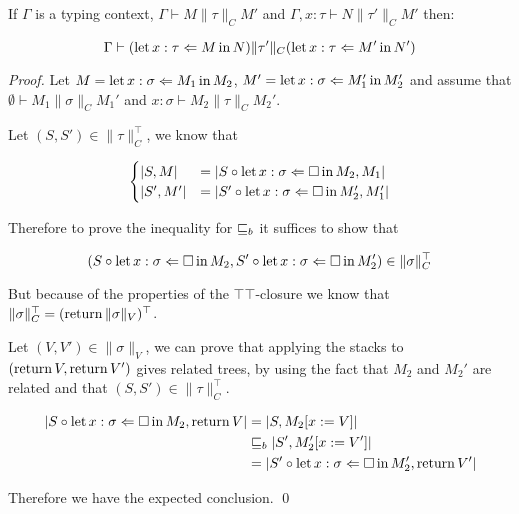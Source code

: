 \begin{lemma}
    If $\Gamma$ is a typing context,
    $\Gamma \vdash M \| \tau \|_C M'$ and 
    $\Gamma, x : \tau \vdash N \| \tau' \|_C M'$
    then:

    \begin{equation*}
        \Gamma \vdash (\Bind{M}{x:\tau}{N}) \| \tau' \|_C 
        (\Bind{M'}{x:\tau}{N'})
    \end{equation*}
\end{lemma}
\begin{proof}
Let $M = \Bind{M_1}{x:\sigma}{M_2}$,
$M' = \Bind{M_1'}{x:\sigma}{M_2'}$ and assume 
that $\emptyset \vdash M_1 \| \sigma \|_C M_1'$
and $x : \sigma \vdash M_2 \| \tau \|_C M_2'$.

Let $(S,S') \in \| \tau \|_C^\top$, we know that

\begin{equation*}
    \begin{cases}
        | S, M | &=
        | S \circ \Bind{\square}{x : \sigma}{M_2}, M_1| \\
        | S', M' | &=
        | S' \circ \Bind{\square}{x : \sigma}{M_2'}, M_1'| \\
    \end{cases}
\end{equation*}

Therefore to prove the inequality for $\sqeq_b$ it suffices 
to show that

\begin{equation*}
    (S \circ \Bind{\square}{x : \sigma}{M_2},
     S' \circ \Bind{\square}{x : \sigma}{M_2'})
     \in \| \sigma \|_C^\top
\end{equation*}

But because of the properties of the 
$\top\top$-closure we know that 
$\| \sigma \|_C^\top = (\Ret \| \sigma \|_V)^\top$.

Let $(V,V') \in \| \sigma \|_V$, we can prove that 
applying the stacks to $(\Ret V, \Ret V')$ gives 
related trees, by using the fact that $M_2$ and $M_2'$
are related and that $(S,S') \in \| \tau \|_C^\top$.

\begin{align*}
    | S \circ \Bind{\square}{x : \sigma}{M_2}, \Ret V| 
    &= |S,  M_2[ x := V] | \\
    & \sqeq_b |S', M_2' [ x := V'] | \\
    &= 
    | S' \circ \Bind{\square}{x : \sigma}{M_2'}, \Ret V'| 
\end{align*}

Therefore we have the expected conclusion.
\qed\end{proof}

